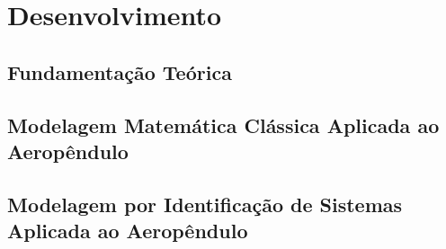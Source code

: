 \chapter{Desenvolvimento}

\section{ Fundamentação Teórica}


\section{Modelagem Matemática Clássica Aplicada ao Aeropêndulo}





\section{Modelagem por Identificação de Sistemas Aplicada ao Aeropêndulo}
